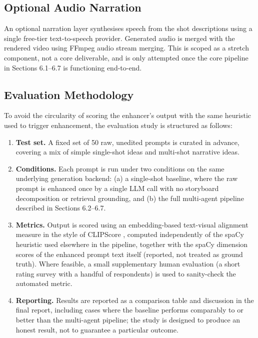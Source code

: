 \documentclass[11pt,a4paper]{article}
\begin{document}
\subsection{Optional Audio Narration}

An optional narration layer synthesises speech from the shot descriptions using a single free-tier text-to-speech provider. Generated audio is merged with the rendered video using FFmpeg audio stream merging. This is scoped as a stretch component, not a core deliverable, and is only attempted once the core pipeline in Sections 6.1--6.7 is functioning end-to-end.

\subsection{Evaluation Methodology}

To avoid the circularity of scoring the enhancer's output with the same heuristic used to trigger enhancement, the evaluation study is structured as follows:

\begin{enumerate}[leftmargin=*]
\item \textbf{Test set.} A fixed set of 50 raw, unedited prompts is curated in advance, covering a mix of simple single-shot ideas and multi-shot narrative ideas.
\item \textbf{Conditions.} Each prompt is run under two conditions on the same underlying generation backend: (a) a single-shot baseline, where the raw prompt is enhanced once by a single LLM call with no storyboard decomposition or retrieval grounding, and (b) the full multi-agent pipeline described in Sections 6.2--6.7.
\item \textbf{Metrics.} Output is scored using an embedding-based text-visual alignment measure in the style of CLIPScore \cite{clipscore}, computed independently of the spaCy heuristic used elsewhere in the pipeline, together with the spaCy dimension scores of the enhanced prompt text itself (reported, not treated as ground truth). Where feasible, a small supplementary human evaluation (a short rating survey with a handful of respondents) is used to sanity-check the automated metric.
\item \textbf{Reporting.} Results are reported as a comparison table and discussion in the final report, including cases where the baseline performs comparably to or better than the multi-agent pipeline; the study is designed to produce an honest result, not to guarantee a particular outcome.
\end{enumerate}
\end{document}
